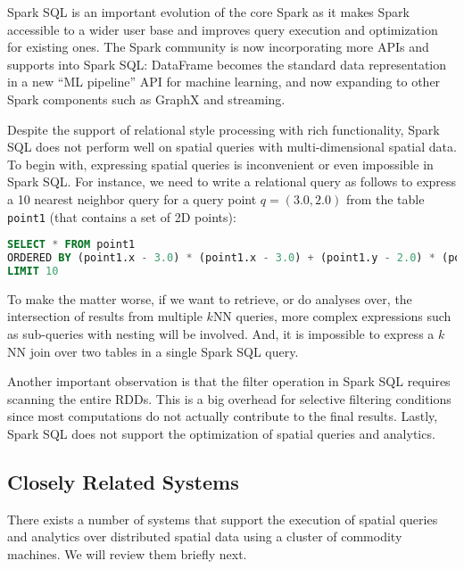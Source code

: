 Spark SQL is an important evolution of the core Spark as it makes
Spark accessible to a wider user base and improves query execution and
optimization for existing ones. The Spark community is now
incorporating more APIs and supports into Spark SQL: DataFrame becomes
the standard data representation in a new ``ML pipeline'' API for
machine learning, and now expanding to other Spark components such as
GraphX and streaming.

Despite the support of relational style processing with rich
functionality, Spark SQL does not perform well on spatial queries with
multi-dimensional spatial data. To begin with, expressing spatial
queries is inconvenient or even impossible in Spark SQL. For instance,
we need to write a relational query as follows to express a 10 nearest
neighbor query for a query point $q=(3.0, 2.0)$ from the table
\texttt{point1} (that contains a set of 2D points):
\begin{lstlisting}[language=SQL]
SELECT * FROM point1
ORDERED BY (point1.x - 3.0) * (point1.x - 3.0) + (point1.y - 2.0) * (point1.y - 2.0)
LIMIT 10
\end{lstlisting}
To make the matter worse, if we want to retrieve, or do analyses over,
the intersection of results from multiple $k$NN queries, more complex
expressions such as sub-queries with nesting will be involved. And, it
is impossible to express a $k$NN join over two tables in a single
Spark SQL query.

Another important observation is that the filter operation in Spark
SQL requires scanning the entire RDDs. This is a big overhead for
selective filtering conditions since most computations do not actually
contribute to the final results.  Lastly, Spark SQL does not support
the optimization of spatial queries and analytics.

\subsection{Closely Related Systems}
\label{sub:related_sys}
There exists a number of systems that support the execution of spatial
queries and analytics over distributed spatial data using a cluster of
commodity machines. We will review them briefly next.

